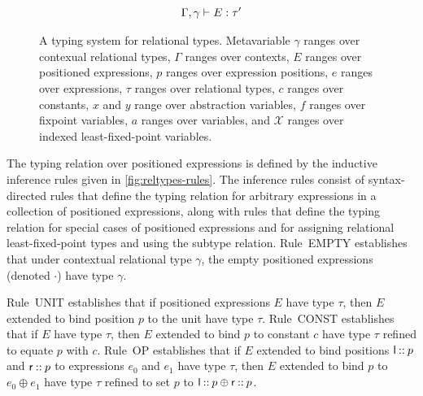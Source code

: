 \begin{figure}
\begin{gather*}
{      %
      \Gamma, \gamma \judges E : \tau' }
  \end{gather*}
  \caption{A typing system for relational types.
    Metavariable %
    $\gamma$ ranges over contexual relational types, %
    $\Gamma$ ranges over contexts, %
    $E$ ranges over positioned expressions, %
    $p$ ranges over expression positions, %
    $e$ ranges over expressions, %
    $\tau$ ranges over relational types, %
    $c$ ranges over constants, %
    $x$ and $y$ range over abstraction variables, %
    $f$ ranges over fixpoint variables, %
    $a$ ranges over variables, and
    $\mathcal{X}$ ranges over indexed least-fixed-point variables. }
  \label{fig:reltypes-rules}
\end{figure}

The typing relation over positioned expressions is defined by the
inductive inference rules given in \autoref{fig:reltypes-rules}.
%
The inference rules consist of syntax-directed rules that define the
typing relation for arbitrary expressions in a collection of
positioned expressions, along with rules that define the typing
relation for special cases of positioned expressions and for assigning
relational least-fixed-point types and using the subtype relation.
Rule~EMPTY establishes that under contextual relational type $\gamma$,
the empty positioned expressions (denoted $\cdot$) have type $\gamma$.

Rule~UNIT establishes that if positioned expressions $E$ have type
$\tau$, then $E$ extended to bind position $p$ to the unit have type
$\tau$.
Rule~CONST establishes that if $E$ have type $\tau$, then $E$ extended
to bind $p$ to constant $c$ have type $\tau$ refined to equate $p$
with $c$.
Rule~OP establishes that if $E$ extended to bind positions
$\mathsf{l} \mathbin{::} p$ and $\mathsf{r} \mathbin{::} p$ to expressions $e_0$
and $e_1$ have type $\tau$, then $E$ extended to bind $p$ to
$e_0 \oplus e_1$ have type $\tau$ refined to set $p$ to
$\mathsf{l} \mathbin{::} p \oplus \mathsf{r} \mathbin{::} p$.


